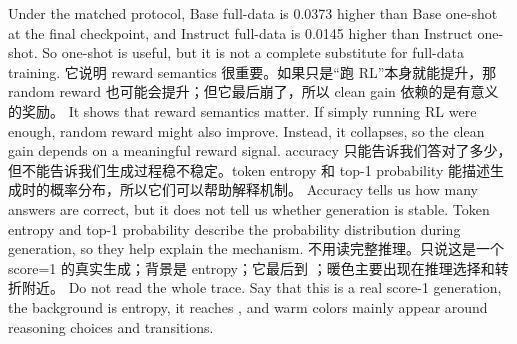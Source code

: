 {}\markdownRendererInterblockSeparator
{}Under the matched protocol, Base full-data is 0.0373 higher than Base one-shot at the final checkpoint, and Instruct full-data is 0.0145 higher than Instruct one-shot. So one-shot is useful, but it is not a complete substitute for full-data training.\markdownRendererInterblockSeparator
{}\markdownRendererInterblockSeparator
{}\markdownRendererInterblockSeparator
{}它说明 reward semantics 很重要。如果只是“跑 RL”本身就能提升，那 random reward 也可能会提升；但它最后崩了，所以 clean gain 依赖的是有意义的奖励。\markdownRendererInterblockSeparator
{}\markdownRendererInterblockSeparator
{}It shows that reward semantics matter. If simply running RL were enough, random reward might also improve. Instead, it collapses, so the clean gain depends on a meaningful reward signal.\markdownRendererInterblockSeparator
{}\markdownRendererInterblockSeparator
{}\markdownRendererInterblockSeparator
{}accuracy 只能告诉我们答对了多少，但不能告诉我们生成过程稳不稳定。token entropy 和 top-1 probability 能描述生成时的概率分布，所以它们可以帮助解释机制。\markdownRendererInterblockSeparator
{}\markdownRendererInterblockSeparator
{}Accuracy tells us how many answers are correct, but it does not tell us whether generation is stable. Token entropy and top-1 probability describe the probability distribution during generation, so they help explain the mechanism.\markdownRendererInterblockSeparator
{}\markdownRendererInterblockSeparator
{}\markdownRendererInterblockSeparator
{}不用读完整推理。只说这是一个 score=1 的真实生成；背景是 entropy；它最后到 ；暖色主要出现在推理选择和转折附近。\markdownRendererInterblockSeparator
{}\markdownRendererInterblockSeparator
{}Do not read the whole trace. Say that this is a real score-1 generation, the background is entropy, it reaches , and warm colors mainly appear around reasoning choices and transitions.\markdownRendererInterblockSeparator
